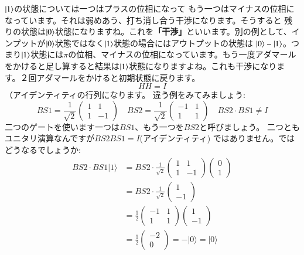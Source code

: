 $\ket{1}$の状態については一つはプラスの位相になって
もう一つはマイナスの位相になっています。それは弱めあう、打ち消し合う干渉になります。そうすると 残りの状態は$\ket{0}$状態になりますね。これを\textbf{「干渉」}といいます。別の例として、インプットが$\ket{0}$状態ではなく$\ket{1}$状態の場合にはアウトプットの状態は $\ket{0}-\ket{1}$。つまり$\ket{1}$状態には$\pi$の位相、マイナスの位相になっています。もう一度アダマールをかけると足し算すると結果は$\ket{1}$状態になりますよね。これも干渉になります。２回アダマールをかけると初期状態に戻ります。
$$H H = I$$（アイデンティティの行列になります。
違う例をみてみましょう:
\begin{equation}
B S 1=\frac{1}{\sqrt{2}}\left(\begin{array}{cc}
1 & 1 \\
1 & -1
\end{array}\right) \quad B S 2=\frac{1}{\sqrt{2}}\left(\begin{array}{cc}
-1 & 1 \\
1 & 1
\end{array}\right) \quad B S 2 \cdot B S 1 \neq I
\end{equation}
二つのゲートを使います一つは$BS1$、もう一つを$BS2$と呼びましょう。
二つともユニタリ演算なんですが$BS2 BS1 = I $(アイデンティティ) ではありません。ではどうなるでしょうか:
\begin{equation}
\begin{aligned}
B S 2 \cdot B S 1|1\rangle &=B S 2 \cdot \frac{1}{\sqrt{2}}\left(\begin{array}{cc}
1 & 1 \\
1 & -1
\end{array}\right)\left(\begin{array}{l}
0 \\
1
\end{array}\right) \\
&=B S 2 \cdot \frac{1}{\sqrt{2}}\left(\begin{array}{c}
1 \\
-1
\end{array}\right) \\
&=\frac{1}{2}\left(\begin{array}{cc}
-1 & 1 \\
1 & 1
\end{array}\right)\left(\begin{array}{c}
1 \\
-1
\end{array}\right) \\
&=\frac{1}{2}\left(\begin{array}{c}
-2 \\
0
\end{array}\right)=-|0\rangle=|0\rangle
\end{aligned}
\end{equation}

